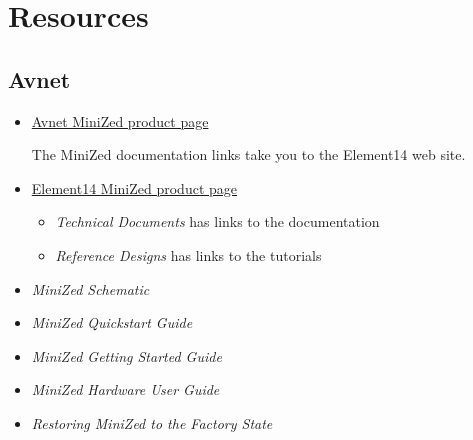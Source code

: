 \section{Resources}

\subsection{Avnet}
%
\begin{itemize}
\item \href{https://www.avnet.com/wps/portal/us/products/avnet-boards/avnet-board-families/minized}{Avnet MiniZed product page}

The MiniZed documentation links take you to the Element14 web site.
\item \href{https://www.element14.com/community/docs/DOC-95639}{Element14 MiniZed product page}
\begin{itemize}
\item \emph{Technical Documents} has links to the documentation
\item \emph{Reference Designs} has links to the tutorials
\end{itemize}
%
\item \emph{MiniZed Schematic}~\cite{Avnet_MiniZed_Schematic_2017}
\item \emph{MiniZed Quickstart Guide}~\cite{Avnet_MiniZed_QSC_2017}
\item \emph{MiniZed Getting Started Guide}~\cite{Avnet_MiniZed_GSG_2018}
\item \emph{MiniZed Hardware User Guide}~\cite{Avnet_MiniZed_HW_2020}
\item \emph{Restoring MiniZed to the Factory State}~\cite{Avnet_MiniZed_Restore_2018}
\end{itemize}

